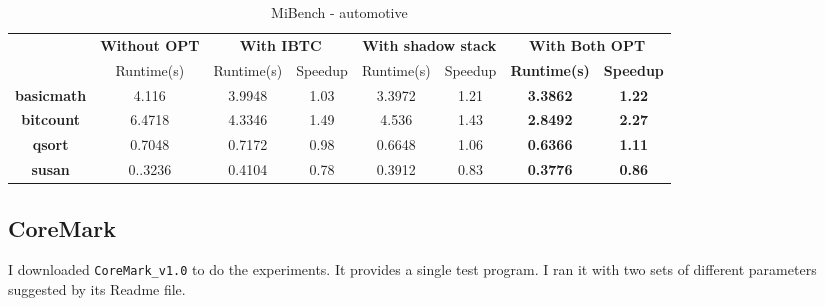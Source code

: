 \documentclass[12pt]{article}
\begin{document}
        \begin{table}[h!]
            \centering
            \caption{MiBench - automotive}
            \label{my-label}
            \begin{tabular}{|c|c|c|c|c|c|c|c|}
                \hline
                & \textbf{Without OPT} & \multicolumn{2}{c|}{\textbf{With IBTC}} & \multicolumn{2}{c|}{\textbf{With shadow stack}} & \multicolumn{2}{c|}{{\color[HTML]{FE0000} \textbf{With Both OPT}}}                   \\ \cline{2-8} 
                \multirow{-2}{*}{\textbf{}} & Runtime(s)           & Runtime(s)           & Speedup          & Runtime(s)               & Speedup              & {\color[HTML]{FE0000} \textbf{Runtime(s)}} & {\color[HTML]{FE0000} \textbf{Speedup}} \\ \hline
                \textbf{basicmath}          & 4.116                & 3.9948               & 1.03             & 3.3972                   & 1.21                 & {\color[HTML]{FE0000} \textbf{3.3862}}     & {\color[HTML]{FE0000} \textbf{1.22}}    \\ \hline
                \textbf{bitcount}           & 6.4718               & 4.3346               & 1.49             & 4.536                    & 1.43                 & {\color[HTML]{FE0000} \textbf{2.8492}}     & {\color[HTML]{FE0000} \textbf{2.27}}    \\ \hline
                \textbf{qsort}              & 0.7048               & 0.7172               & 0.98             & 0.6648                   & 1.06                 & {\color[HTML]{FE0000} \textbf{0.6366}}     & {\color[HTML]{FE0000} \textbf{1.11}}    \\ \hline
                \textbf{susan}              & 0..3236              & 0.4104               & 0.78             & 0.3912                   & 0.83                 & {\color[HTML]{FE0000} \textbf{0.3776}}     & {\color[HTML]{FE0000} \textbf{0.86}}    \\ \hline
            \end{tabular}
        \end{table}
        

    \subsection{CoreMark}
        I downloaded \verb|CoreMark_v1.0| to do the experiments.
        It provides a single test program.
        I ran it with two sets of different parameters suggested by its Readme file.
\end{document}
